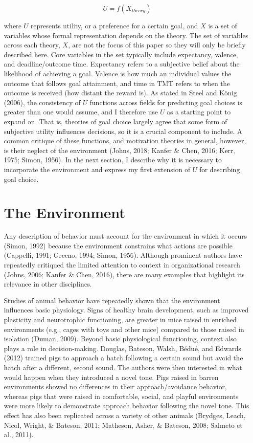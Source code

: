 \documentclass[english,man]{apa6}
\newcounter{author}
\theoremstyle{definition}
\theoremstyle{definition}
\theoremstyle{definition}
\theoremstyle{remark}
\begin{document}
\begin{equation}
U = f(X_{theory})
\end{equation}

\noindent where \(U\) represents utility, or a preference for a certain
goal, and \(X\) is a set of variables whose formal representation
depends on the theory. The set of variables across each theory, \(X\),
are not the focus of this paper so they will only be briefly described
here. Core variables in the set typically include expectancy, valence,
and deadline/outcome time. Expectancy refers to a subjective belief
about the likelihood of achieving a goal. Valence is how much an
individual values the outcome that follows goal attainment, and time in
TMT refers to when the outcome is received (how distant the reward is).
As stated in Steel and König (2006), the consistency of \(U\) functions
across fields for predicting goal choices is greater than one would
assume, and I therefore use \(U\) as a starting point to expand on. That
is, theories of goal choice largely agree that some form of subjective
utility influences decisions, so it is a crucial component to include. A
common critique of these functions, and motivation theories in general,
however, is their neglect of the environment (Johns, 2018; Kanfer \&
Chen, 2016; Kerr, 1975; Simon, 1956). In the next section, I describe
why it is necessary to incorporate the environment and express my first
extension of \(U\) for describing goal choice.

\section{The Environment}\label{the-environment}

Any description of behavior must account for the environment in which it
occurs (Simon, 1992) because the environment constrains what actions are
possible (Cappelli, 1991; Greeno, 1994; Simon, 1956). Although prominent
authors have repeatedly critiqued the limited attention to context in
organizational research (Johns, 2006; Kanfer \& Chen, 2016), there are
many examples that highlight its relevance in other disciplines.

Studies of animal behavior have repeatedly shown that the environment
influences basic physiology. Signs of healthy brain development, such as
improved plasticity and neurotrophic functioning, are greater in mice
raised in enriched environments (e.g., cages with toys and other mice)
compared to those raised in isolation (Duman, 2009). Beyond basic
physiological functioning, context also plays a role in decision-making.
Douglas, Bateson, Walsh, Bédué, and Edwards (2012) trained pigs to
approach a hatch following a certain sound but avoid the hatch after a
different, second sound. The authors were then interested in what would
happen when they introduced a novel tone. Pigs raised in barren
environments showed no differences in their approach/avoidance behavior,
whereas pigs that were raised in comfortable, social, and playful
environments were more likely to demonstrate approach behavior following
the novel tone. This effect has also been replicated across a variety of
other animals (Brydges, Leach, Nicol, Wright, \& Bateson, 2011;
Matheson, Asher, \& Bateson, 2008; Salmeto et al., 2011).
\end{document}
